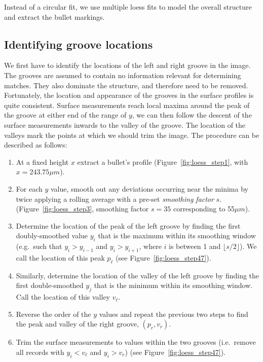 \documentclass[aoas, preprint]{imsart}\usepackage[]{graphicx}\usepackage[]{color}
\begin{document}
Instead of a circular fit, we use multiple loess fits to model the overall structure and extract the bullet markings. 

\subsection{Identifying groove locations}
We first have to identify the locations of the left and right groove in the image. The grooves are assumed to contain no information relevant for determining matches. They also dominate the structure, and therefore need to be removed.  
Fortunately, the location and appearance of the grooves in the surface profiles is quite consistent.
Surface measurements reach local maxima around the peak of the groove at either end of the range of $y$, we can then follow the descent of the surface measurements inwards to the valley of the groove. 
The location of the valleys mark the points at which we should trim the image. The procedure can be described as follows:

\begin{enumerate}
    \item At a fixed height $x$ extract a bullet's profile (Figure~\ref{fig:loess_step1}, with $x = 243.75\mu m$).
    \item For each $y$ value, smooth out any deviations occurring near the minima by twice applying a rolling average with a pre-set \emph{smoothing factor} $s$. (Figure~\ref{fig:loess_step3}, smoothing factor $s = 35$ corresponding to 55$\mu m$).
    \item Determine the location of the peak of the left groove by finding the first doubly-smoothed value $y_i$ that is the maximum within its smoothing window (e.g.\ such that $y_i > y_{i - 1}$ and $y_i > y_{i + 1}$, where $i$ is between 1  and $\lfloor s/2 \rfloor$). We call the location of this peak $p_{\ell}$ (see Figure~\ref{fig:loess_step47}). 
    \item Similarly, determine the location of the valley of the left groove by finding the first double-smoothed $y_j$ that is the minimum within its smoothing window. Call the location of this valley $v_{\ell}$.
    \item Reverse the order of the $y$ values and repeat the previous two steps to find the peak and valley of the right groove, $(p_{r}, v_{r})$.
    \item Trim the surface measurements to values within the two grooves (i.e.\ remove all records with $y_i < v_{\ell}$ and $y_i > v_{r}$) (see Figure~\ref{fig:loess_step47}).
\end{enumerate}
\end{document}
